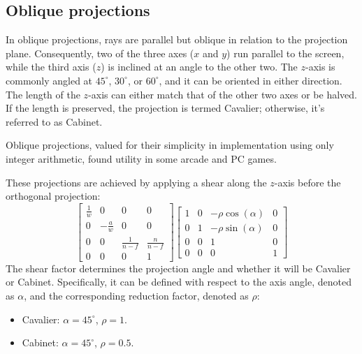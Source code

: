 \subsection{Oblique projections}
In oblique projections, rays are parallel but oblique in relation to the projection plane. 
Consequently, two of the three axes ($x$ and $y$) run parallel to the screen, while the third axis ($z$) is inclined at an angle to the other two.
The $z$-axis is commonly angled at $45^\circ$, $30^\circ$, or $60^\circ$, and it can be oriented in either direction.
The length of the $z$-axis can either match that of the other two axes or be halved. 
If the length is preserved, the projection is termed Cavalier; otherwise, it's referred to as Cabinet.

Oblique projections, valued for their simplicity in implementation using only integer arithmetic, found utility in some arcade and PC games.

These projections are achieved by applying a shear along the $z$-axis before the orthogonal projection:
\[\begin{bmatrix}
    \frac{1}{w} & 0 & 0 & 0 \\ 
    0 & -\frac{a}{w} & 0 & 0 \\ 
    0 & 0 & \frac{1}{n-f} & \frac{n}{n-f} \\ 
    0 & 0 & 0 & 1 
\end{bmatrix}\begin{bmatrix}
    1 & 0 & -\rho\cos(\alpha) & 0 \\ 
    0 & 1 & -\rho\sin(\alpha) & 0 \\ 
    0 & 0 & 1 & 0 \\ 
    0 & 0 & 0 & 1 
\end{bmatrix}\]
The shear factor determines the projection angle and whether it will be Cavalier or Cabinet. 
Specifically, it can be defined with respect to the axis angle, denoted as $\alpha$, and the corresponding reduction factor, denoted as $\rho$:
\begin{itemize}
    \item Cavalier: $\alpha=45^\circ$, $\rho=1$.
    \item Cabinet: $\alpha=45^\circ$, $\rho=0.5$.
\end{itemize}